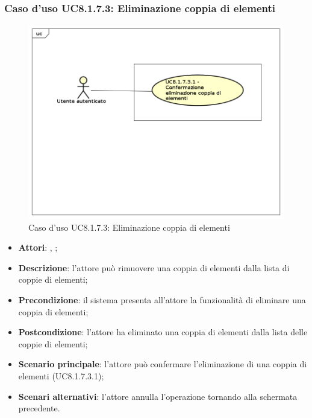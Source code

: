 	\subsubsection{Caso d'uso UC8.1.7.3: Eliminazione coppia di elementi}
	\begin{figure}[h]
		\centering
		\includegraphics[scale=0.5,keepaspectratio]{UML/UC8_1_7_3.png}
		\caption{Caso d'uso UC8.1.7.3: Eliminazione coppia di elementi}
	\end{figure}
	\FloatBarrier
	\begin{itemize}
		\item \textbf{Attori}: \uau, \uaupro;
		\item \textbf{Descrizione}: l'attore può rimuovere una coppia di elementi dalla lista di coppie di elementi;
		\item \textbf{Precondizione}: il sistema presenta all'attore la funzionalità di eliminare una coppia di elementi;
		\item \textbf{Postcondizione}: l'attore ha eliminato una coppia di elementi dalla lista delle coppie di elementi;
		\item \textbf{Scenario principale}: l'attore può confermare l'eliminazione di una coppia di elementi (UC8.1.7.3.1);	
		\item \textbf{Scenari alternativi}: l'attore annulla l'operazione tornando alla schermata precedente.
	\end{itemize}

